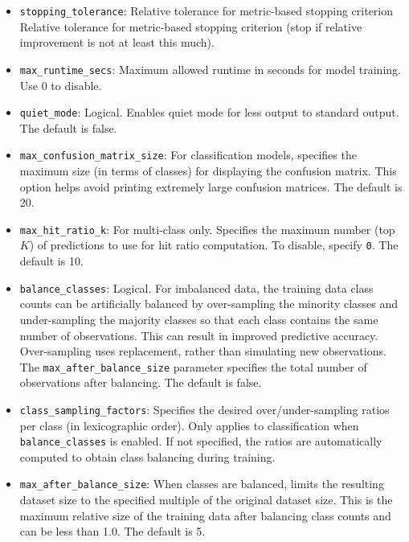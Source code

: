 {{\begin{itemize}
\item \texttt{stopping\_tolerance}: Relative tolerance for metric-based stopping criterion Relative tolerance for metric-based stopping criterion (stop if relative improvement is not at least this much).

\item \texttt{max\_runtime\_secs}: Maximum allowed runtime in seconds for model training. Use 0 to disable.

\item \texttt{quiet\_mode}: Logical. Enables quiet mode for less output to standard output. The default is false.

\item \texttt{max\_confusion\_matrix\_size}: For classification models, specifies the maximum size (in terms of classes) for displaying the confusion matrix. This option helps avoid printing extremely large confusion matrices. The default is 20.

\item \texttt{max\_hit\_ratio\_k}: For multi-class only. Specifies the maximum number (top $K$) of predictions to use for hit ratio computation. To disable, specify \texttt{0}. The default is 10.

\item \texttt{balance\_classes}: Logical. For imbalanced data, the training data class counts can be artificially balanced by over-sampling the minority classes and under-sampling the majority classes so that each class  contains the same number of observations.  This can result in improved predictive accuracy.  Over-sampling  uses replacement, rather than simulating new observations. The \texttt{max\_after\_balance\_size} parameter specifies the total number of observations after balancing. The default is false.

\item \texttt{class\_sampling\_factors}: Specifies the desired over/under-sampling ratios per class (in lexicographic order). Only applies to classification when \texttt{balance\_classes} is enabled. If not specified, the ratios are automatically computed to obtain class balancing during training.

\item \texttt{max\_after\_balance\_size}: When classes are balanced, limits the resulting dataset size to the specified multiple of the original dataset size. This is the maximum relative size of the training data after balancing class counts and can be less than 1.0. The default is 5.


\end{itemize}}}
